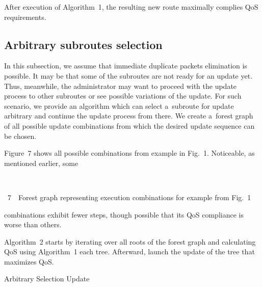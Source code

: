 \begin{multicols}{2}
After execution of Algorithm~1, the resulting new route maximally complies QoS 
requirements.


\subsection{Arbitrary subroutes selection} 


\noindent
In this subsection, we assume that immediate duplicate packets elimination is possible. 
It may be that some of the subroutes are not ready for an update yet. 
Thus, meanwhile, the administrator may want to proceed with the update process 
to other subroutes or see possible variations of the update. 
For such scenario, we provide an algorithm which can select a~subroute for 
update arbitrary and continue the update process from there. 
We create a~forest graph of all possible update combinations from which the 
desired update sequence can be chosen. 
{

}
 


Figure~7 shows all possible combinations from example 
in Fig.~1. Noticeable, as mentioned earlier, some\linebreak\vspace*{-12pt}

{ \begin{center}  %
\vspace*{1pt}
  \mbox{%
 \epsfxsize=71.694mm 
 }


\end{center}


\noindent
{{\figurename~7}\ \ \small{Forest graph representing execution combinations for example from 
 Fig.~1}}
}

\vspace*{12pt}


\noindent
 combinations 
exhibit fewer steps, though possible that its QoS compliance is worse than others.



Algorithm~2 starts by iterating over all roots of the forest graph and 
calculating QoS using Algorithm~1 each tree. Afterward, launch the update 
of the tree that maximizes QoS.

\begin{algorithm*} %
\setlength{\algowidth}{100mm}
 \setlength{\hsize}{\algowidth}
 \caption{Arbitrary Selection Update}
 \label{alg:arbitrary_update}
 \small
 

\end{algorithm*}
\end{multicols}
